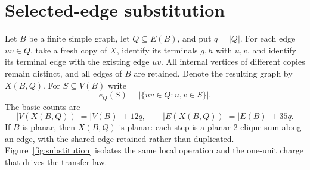 \documentclass[11pt]{article}
\theoremstyle{definition}
\theoremstyle{remark}
\begin{document}
\section{Selected-edge substitution}

Let $B$ be a finite simple graph, let $Q\subseteq E(B)$, and put $q=|Q|$.
For each edge $uv\in Q$, take a fresh copy of $X$, identify its terminals
$g,h$ with $u,v$, and identify its terminal edge with the existing edge
$uv$.  All internal vertices of different copies remain distinct, and all
edges of $B$ are retained.  Denote the resulting graph by $X(B,Q)$.
For $S\subseteq V(B)$ write
\[
 e_Q(S)=|\{uv\in Q:u,v\in S\}|.
\]
The basic counts are
\begin{equation}\label{eq:subcounts}
 |V(X(B,Q))|=|V(B)|+12q,
 \qquad
 |E(X(B,Q))|=|E(B)|+35q.
\end{equation}
If $B$ is planar, then $X(B,Q)$ is planar:
each step is a planar $2$-clique sum along an edge, with the shared edge
retained rather than duplicated.  Figure~\ref{fig:substitution} isolates the
same local operation and the one-unit charge that drives the transfer law.
\end{document}
